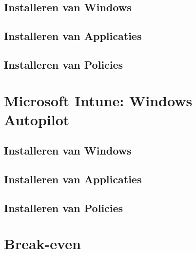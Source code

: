\subsection{Installeren van Windows}

\subsection{Installeren van Applicaties}

\subsection{Installeren van Policies}




\section{Microsoft Intune: Windows Autopilot}

\subsection{Installeren van Windows}

\subsection{Installeren van Applicaties}

\subsection{Installeren van Policies}




\section{Break-even}


